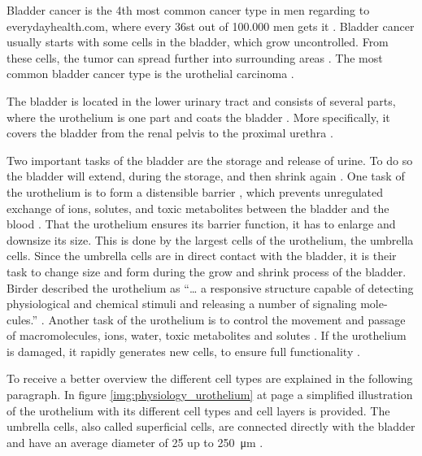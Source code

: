 Bladder cancer is the 4th most common cancer type in men regarding to everydayhealth.com, where every 36st out of 100.000 men gets it \cite{EveryDayHealth.com}. Bladder cancer usually starts with some cells in the bladder, which grow uncontrolled. From these cells, the tumor can spread further into surrounding areas \cite{Cancer.org}. The most common bladder cancer type is the urothelial carcinoma \cite{Cancer.org}.

The bladder is located in the lower urinary tract and consists of several parts, where the urothelium is one part and coats the bladder \cite{Lazzeri2006}. More specifically, it covers the bladder from the renal pelvis to the proximal urethra \cite{Yamany2014, Birder2005}.

Two important tasks of the bladder are the storage and release of urine. To do so the bladder will extend, during the storage, and then shrink again \cite{Karl-ErikAndersson2004}. One task of the urothelium is to form a distensible barrier \cite{Apodaca2004, Lazzeri2006, PuneetKhandelwal2009, Lewis2000, WRCross2005}, which prevents unregulated exchange of ions, solutes, and toxic metabolites between the bladder and the blood \cite{Apodaca2004, Lazzeri2006, PuneetKhandelwal2009, Lewis2000}. That the urothelium ensures its barrier function, it has to enlarge and downsize its size. This is done by the largest cells of the urothelium, the umbrella cells. Since the umbrella cells are in direct contact with the bladder, it is their task to change size and form during the grow and shrink process of the bladder. Birder described the urothelium as “… a responsive structure capable of detecting physiological and chemical stimuli and releasing a number of signaling mole-cules.” \cite{Birder2005}. Another task of the urothelium is to control the movement and passage of macromolecules, ions, water, toxic metabolites and solutes \cite{Apodaca2004, PuneetKhandelwal2009}. If the urothelium is damaged, it rapidly generates new cells, to ensure full functionality \cite{Apodaca2004, Yamany2014, PuneetKhandelwal2009}.

To receive a better overview the different cell types are explained in the following paragraph. In figure \ref{img:physiology_urothelium} at page \pageref{img:physiology_urothelium} a simplified illustration of the urothelium with its different cell types and cell layers is provided. \newline
The umbrella cells, also called superficial cells, are connected directly with the bladder and have an average diameter of 25 up to \SI{250}{\micro\metre} \cite{Yamany2014, PuneetKhandelwal2009}. 

